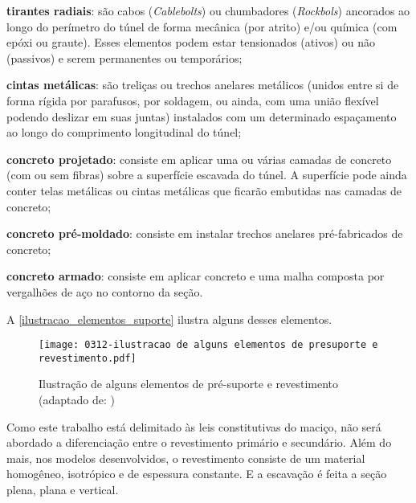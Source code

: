 \begin{alineas}
	
	\item \textbf{tirantes radiais}: são cabos (\textit{Cablebolts}) ou chumbadores (\textit{Rockbols}) ancorados ao longo do perímetro do túnel de forma mecânica (por atrito) e/ou química (com epóxi ou graute). Esses elementos podem estar tensionados (ativos) ou não (passivos) e serem permanentes ou temporários;
	
	\item \textbf{cintas metálicas}: são treliças ou trechos anelares metálicos (unidos entre si de forma rígida por parafusos, por soldagem, ou ainda, com uma união flexível podendo deslizar em suas juntas) instalados com um determinado espaçamento ao longo do comprimento longitudinal do túnel;
	
	\item \textbf{concreto projetado}: consiste em aplicar uma ou várias camadas de concreto (com ou sem fibras) sobre a superfície escavada do túnel. A superfície pode ainda conter telas metálicas ou cintas metálicas que ficarão embutidas nas camadas de concreto;
	
	\item \textbf{concreto pré-moldado}: consiste em instalar trechos anelares pré-fabricados de concreto;
	
	\item \textbf{concreto armado}: consiste em aplicar concreto e uma malha composta por vergalhões de aço no contorno da seção.
	
\end{alineas}

A \autoref{ilustracao_elementos_suporte} ilustra alguns desses elementos.

\begin{figure}[H]
	\begin{center}
		\texttt{[image: 0312-ilustracao de alguns elementos de presuporte e revestimento.pdf]}
	\end{center}
	\caption{\label{ilustracao_elementos_suporte}Ilustração de alguns elementos de pré-suporte e revestimento (adaptado de: )}
\end{figure}

Como este trabalho está delimitado às leis constitutivas do maciço, não será abordado a diferenciação entre o revestimento primário e secundário. Além do mais, nos modelos desenvolvidos, o revestimento consiste de um material homogêneo, isotrópico e de espessura constante. E a escavação é feita a seção plena, plana e vertical.


